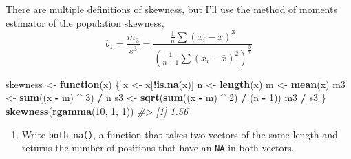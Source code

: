 \documentclass[]{book}
\newenvironment{Shaded}{\begin{snugshade}}{\end{snugshade}}
\newcommand{\CommentTok}[1]{\textcolor[rgb]{0.56,0.35,0.01}{\textit{#1}}}
\newcommand{\ControlFlowTok}[1]{\textcolor[rgb]{0.13,0.29,0.53}{\textbf{#1}}}
\newcommand{\DecValTok}[1]{\textcolor[rgb]{0.00,0.00,0.81}{#1}}
\newcommand{\KeywordTok}[1]{\textcolor[rgb]{0.13,0.29,0.53}{\textbf{#1}}}
\newcommand{\NormalTok}[1]{#1}
\newcommand{\OperatorTok}[1]{\textcolor[rgb]{0.81,0.36,0.00}{\textbf{#1}}}
\newcommand{\StringTok}[1]{\textcolor[rgb]{0.31,0.60,0.02}{#1}}
\providecommand{\tightlist}{%
  \setlength{\itemsep}{0pt}\setlength{\parskip}{0pt}}
\theoremstyle{definition}
\theoremstyle{definition}
\theoremstyle{definition}
\theoremstyle{remark}
\begin{document}
There are multiple definitions of
\href{https://en.wikipedia.org/wiki/Skewness}{skewness}, but I'll use
the method of moments estimator of the population skewness, \[
b_1 =  \frac{m_3}{s^3} = \frac{\frac{1}{n} \sum (x_i - \bar{x}) ^ 3}{{\left(\frac{1}{n - 1} \sum (x_i - \bar{x}) ^ 2\right)} ^ \frac{3}{2}}
\]

\begin{Shaded}
\begin{Highlighting}[]
\NormalTok{skewness <-}\StringTok{ }\ControlFlowTok{function}\NormalTok{(x) \{}
\NormalTok{  x <-}\StringTok{ }\NormalTok{x[}\OperatorTok{!}\KeywordTok{is.na}\NormalTok{(x)] }
\NormalTok{  n <-}\StringTok{ }\KeywordTok{length}\NormalTok{(x)}
\NormalTok{  m <-}\StringTok{ }\KeywordTok{mean}\NormalTok{(x)}
\NormalTok{  m3 <-}\StringTok{ }\KeywordTok{sum}\NormalTok{((x }\OperatorTok{-}\StringTok{ }\NormalTok{m) }\OperatorTok{^}\StringTok{ }\DecValTok{3}\NormalTok{) }\OperatorTok{/}\StringTok{ }\NormalTok{n}
\NormalTok{  s3 <-}\StringTok{ }\KeywordTok{sqrt}\NormalTok{(}\KeywordTok{sum}\NormalTok{((x }\OperatorTok{-}\StringTok{ }\NormalTok{m) }\OperatorTok{^}\StringTok{ }\DecValTok{2}\NormalTok{) }\OperatorTok{/}\StringTok{ }\NormalTok{(n }\OperatorTok{-}\StringTok{ }\DecValTok{1}\NormalTok{))}
\NormalTok{  m3 }\OperatorTok{/}\StringTok{ }\NormalTok{s3}
\NormalTok{\}}
\KeywordTok{skewness}\NormalTok{(}\KeywordTok{rgamma}\NormalTok{(}\DecValTok{10}\NormalTok{, }\DecValTok{1}\NormalTok{, }\DecValTok{1}\NormalTok{))}
\CommentTok{#> [1] 1.56}
\end{Highlighting}
\end{Shaded}

\begin{enumerate}
\def\labelenumi{\arabic{enumi}.}
\setcounter{enumi}{4}
\tightlist
\item
  Write \texttt{both\_na()}, a function that takes two vectors of the
  same length and returns the number of positions that have an
  \texttt{NA} in both vectors.
\end{enumerate}
\end{document}
